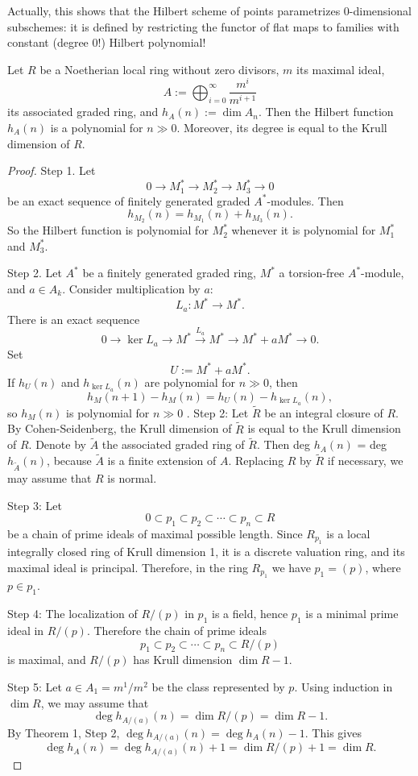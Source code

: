 Actually, this shows that the Hilbert
scheme of points parametrizes 0-dimensional
subschemes: it is defined by restricting
the functor of flat maps to families
with constant (degree 0!) Hilbert polynomial!

\begin{theorem}
\label{theorem-hilbert-polynomial-slide-7}
Let $R$ be a Noetherian local ring without
zero divisors, $m$ its maximal ideal,
$$
A:=\bigoplus_{i=0}^{\infty} \frac{m^i}{
m^{i+1}}
$$
its associated graded ring, and $h_A(n):=
\dim A_n$.
Then the Hilbert function $h_A(n)$ is a
polynomial for $n\gg 0$.
Moreover, its degree is equal to the Krull
dimension of $R$.
\end{theorem}

\begin{proof}
Step 1. Let
  $$
  0\to M_1^\ast\to M_2^\ast\to M_3^\ast\to 0
  $$
  be an exact sequence of finitely generated
  graded $A^\ast$-modules. Then
  $$
  h_{M_2}(n)=h_{M_1}(n)+h_{M_3}(n).
  $$
  So the Hilbert function is polynomial for
  $M_2^\ast$ whenever it is polynomial for
  $M_1^\ast$ and $M_3^\ast$.

  Step 2. Let $A^\ast$ be a finitely
  generated
  graded ring, $M^\ast$ a torsion-free
  $A^\ast$-module, and $a\in A_k$. Consider
  multiplication by $a$:
  $$
  L_a:M^\ast\to M^\ast.
  $$
  There is an exact sequence
  $$
  0\to \ker L_a\to M^\ast
  \xrightarrow{L_a} M^\ast
  \to M^\ast+aM^\ast\to 0.
  $$
  Set
  $$
  U:=M^\ast+aM^\ast.
  $$
  If $h_U(n)$ and $h_{\ker L_a}(n)$ are
  polynomial for $n\gg 0$, then
  $$
  h_M(n+1)-h_M(n)=h_U(n)-h_{\ker L_a}(n),
  $$
  so $h_M(n)$ is polynomial for $n\gg 0$
.
Step 2: Let $\tilde{R}$ be an integral
closure of $R$. By Cohen-Seidenberg, the
Krull dimension of $\tilde{R}$ is equal to
the Krull dimension of $R$. Denote by
$\tilde{A}$ the associated graded ring of
$\tilde{R}$. Then deg $h_A(n)$ = deg
$h_{\tilde{A}}(n)$, because $\tilde{A}$ is a
finite extension of $A$. Replacing $R$ by
$\tilde{R}$ if necessary, we may assume that
$R$ is normal.

Step 3: Let
$$
0\subset p_1\subset p_2\subset \cdots
\subset p_n\subset R
$$
be a chain of prime ideals of maximal
possible length. Since $R_{p_1}$ is a local
integrally closed ring of Krull dimension
1, it is a discrete valuation ring, and its
maximal ideal is principal. Therefore, in
the ring $R_{p_1}$ we have $p_1=(p)$, where
$p\in p_1$.

Step 4: The localization of $R/(p)$ in
$p_1$ is a field, hence $p_1$ is a minimal
prime ideal in $R/(p)$. Therefore the chain
of prime ideals
$$
p_1\subset p_2\subset \cdots\subset p_n
\subset R/(p)
$$
is maximal, and $R/(p)$ has Krull
dimension $\dim R-1$.

Step 5: Let $a\in A_1=m^1/m^2$ be the class
represented by $p$. Using induction in
$\dim R$, we may assume that
$$
\deg h_{A/(a)}(n)=\dim R/(p)=\dim R-1.
$$
By Theorem 1, Step 2, $\deg h_{A/(a)}(n)=
\deg h_A(n)-1$. This gives
$$
\deg h_A(n)=\deg h_{A/(a)}(n)+1=\dim
R/(p)+1=\dim R.
$$
\end{proof}

